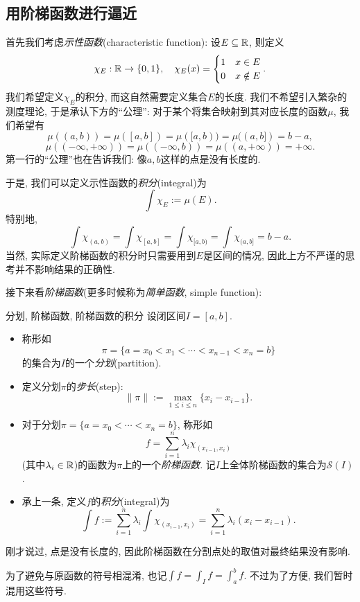 \subsection{用阶梯函数进行逼近}

首先我们考虑\textit{示性函数}(characteristic function): 设$E \subseteq \mathbb{R}$, 则定义$$\chi _{E}:\mathbb{R} \to \{ 0,1 \},\quad \chi _{E} (x) = \begin{cases}
	1 & x \in E \\ 0 & x \notin E
\end{cases}.$$
我们希望定义$\chi _E$的积分, 而这自然需要定义集合$E$的长度. 我们不希望引入繁杂的测度理论, 于是承认下方的“公理”: 对于某个将集合映射到其对应长度的函数$\mu$, 我们希望有$$\mu ((a,b)) = \mu ([a,b]) = \mu ([a,b)) = \mu ((a,b]) = b-a, $$
$$\mu ((-\infty ,+\infty)) = \mu ((-\infty ,b)) = \mu ((a ,+\infty)) = +\infty .$$
第一行的“公理”也在告诉我们: 像$a,b$这样的点是没有长度的. 

于是, 我们可以定义示性函数的\textit{积分}(integral)为$$\int \chi _E := \mu (E). $$
特别地, $$\int \chi _{(a,b)} = \int \chi _{[a,b]} = \int \chi _{[a,b)} = \int \chi _{(a,b]} = b-a. $$
当然, 实际定义阶梯函数的积分时只需要用到$E$是区间的情况, 因此上方不严谨的思考并不影响结果的正确性. 

接下来看\textit{阶梯函数}(更多时候称为\textit{简单函数}, simple function): 

\begin{definition}{分划, 阶梯函数, 阶梯函数的积分}
	设闭区间$I=[a,b]$. 
	\begin{itemize}
		\item 称形如$$\pi = \{ a=x_0<x_1<\cdots <x_{n-1}<x_n=b \}$$
		的集合为$I$的一个\textit{分划}(partition). 
		\item 定义分划$\pi$的\textit{步长}(step): $$\| \pi \| := \max_{1 \leq i \leq n} \{ x_i-x_{i-1} \}. $$
		\item 对于分划$\pi= \{ a=x_0<\cdots <x_n=b \}$, 称形如$$f = \sum_{i=1}^{n} \lambda _i \chi _{(x_{i-1},x_{i})} $$
		(其中$\lambda _i \in \mathbb{R}$)的函数为$\pi$上的一个\textit{阶梯函数}. 记$I$上全体阶梯函数的集合为$\mathcal{S}(I)$. 
		\item 承上一条, 定义$f$的\textit{积分}(integral)为$$\int f := \sum_{i=1}^{n} \lambda _i \int \chi _{(x_{i-1},x_i)} = \sum_{i=1}^{n} \lambda _i (x_i-x_{i-1}). $$
	\end{itemize}
\end{definition}
\begin{remark}
	刚才说过, 点是没有长度的, 因此阶梯函数在分割点处的取值对最终结果没有影响. 
\end{remark}
\begin{remark}
	为了避免与原函数的符号相混淆, 也记$\int f = \int _I f = \int_a^b f$. 不过为了方便, 我们暂时混用这些符号. 
\end{remark}

